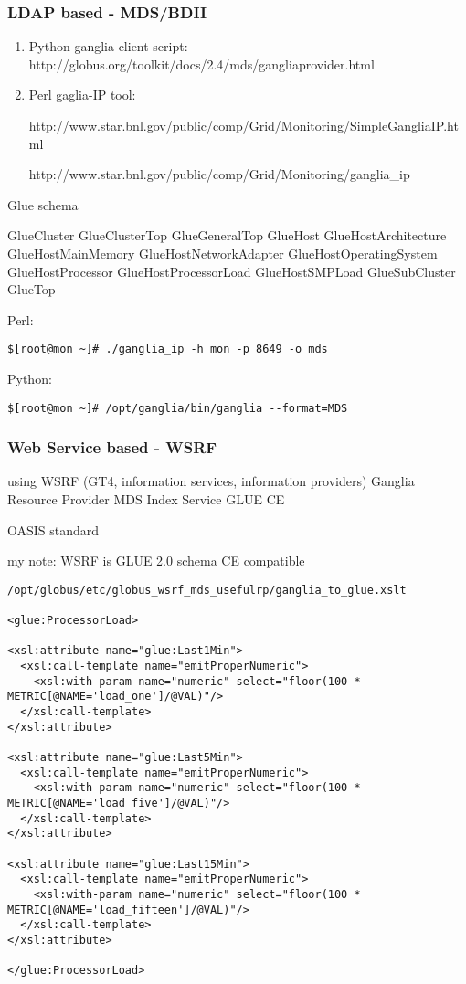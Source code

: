 \subsubsection{LDAP based - MDS/BDII}
\begin{enumerate}
  \item Python ganglia client script:
  http://globus.org/toolkit/docs/2.4/mds/gangliaprovider.html
  \item Perl gaglia-IP tool:
  
  http://www.star.bnl.gov/public/comp/Grid/Monitoring/SimpleGangliaIP.html
  
  http://www.star.bnl.gov/public/comp/Grid/Monitoring/ganglia\_ip

\end{enumerate}

Glue schema

GlueCluster
GlueClusterTop
GlueGeneralTop
GlueHost
GlueHostArchitecture
GlueHostMainMemory
GlueHostNetworkAdapter
GlueHostOperatingSystem
GlueHostProcessor
GlueHostProcessorLoad
GlueHostSMPLoad
GlueSubCluster
GlueTop

Perl:
\begin{lstlisting}
$[root@mon ~]# ./ganglia_ip -h mon -p 8649 -o mds
\end{lstlisting}

Python:
\begin{lstlisting}
$[root@mon ~]# /opt/ganglia/bin/ganglia --format=MDS
\end{lstlisting}


\subsubsection{Web Service based - WSRF}
using WSRF (GT4, information services, information providers)
Ganglia Resource Provider
MDS Index Service
GLUE CE 

OASIS standard

my note: WSRF is GLUE 2.0 schema CE compatible
\begin{verbatim}
/opt/globus/etc/globus_wsrf_mds_usefulrp/ganglia_to_glue.xslt

<glue:ProcessorLoad>

<xsl:attribute name="glue:Last1Min">
  <xsl:call-template name="emitProperNumeric">
    <xsl:with-param name="numeric" select="floor(100 * METRIC[@NAME='load_one']/@VAL)"/>
  </xsl:call-template>
</xsl:attribute>

<xsl:attribute name="glue:Last5Min">
  <xsl:call-template name="emitProperNumeric">
    <xsl:with-param name="numeric" select="floor(100 * METRIC[@NAME='load_five']/@VAL)"/>
  </xsl:call-template>
</xsl:attribute>

<xsl:attribute name="glue:Last15Min">
  <xsl:call-template name="emitProperNumeric">
    <xsl:with-param name="numeric" select="floor(100 * METRIC[@NAME='load_fifteen']/@VAL)"/>
  </xsl:call-template>
</xsl:attribute>

</glue:ProcessorLoad>
\end{verbatim}
